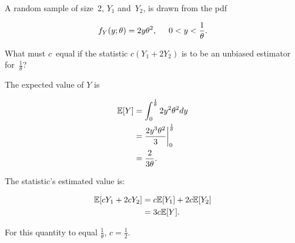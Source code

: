 \begin{problem}
   A random sample of size~2, $Y_1$ and~$Y_2$, is drawn from the pdf

  \begin{equation}
    f_Y(y;\theta) = 2y\theta^2, \hspace{0.5cm}0 < y < \frac{1}{\theta} \text{.}
  \end{equation}

  \noindent
  What must $c$~equal if the statistic ${c(Y_1 + 2Y_2)}$ is to be an unbiased estimator for~$\frac{1}{\theta}$?
\end{problem}

The expected value of $Y$ is

\begin{align}
  \mathbb{E}\lbrack Y\rbrack &= \int_{0}^{\frac{1}{\theta}} 2y^2 \theta^2 dy \\
             &= \frac{2y^3 \theta^2}{3} \bigg\vert_{0}^{\frac{1}{\theta}} \\
             &= \frac{2}{3\theta} \text{.}
\end{align}

The statistic's estimated value is:

\begin{align}
  \mathbb{E}\lbrack cY_1 + 2cY_2\rbrack &= c\mathbb{E}\lbrack Y_1\rbrack + 2c\mathbb{E}\lbrack Y_2\rbrack \\
                        &= 3c\mathbb{E}\lbrack Y\rbrack\text{.}
\end{align}

For this quantity to equal $\frac{1}{\theta}$, $\boxed{c=\frac{1}{2}}$.
